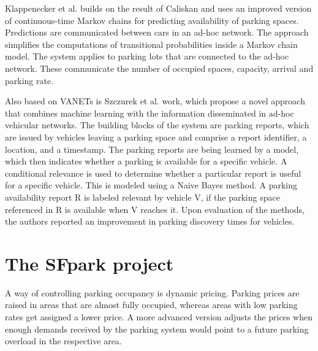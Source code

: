 \documentclass{article}
\newcommand{\cmmnt}[1]{\ignorespaces}
\begin{document}
	Klappenecker et al. \cmmnt{ref klappenecker} builds on the result of Caliskan and uses an improved version of continuous-time Markov chains for predicting availability of parking spaces. Predictions are communicated between cars in an ad-hoc network. The approach simplifies the computations of transitional probabilities inside a Markov chain model. The system applies to parking lots that are connected to the ad-hoc network. These communicate the number of occupied spaces, capacity, arrival and parking rate. 
	
	Also based on VANETs is Szczurek et al. \cmmnt{ref szczurek} work, which propose a novel approach that combines machine learning with the information disseminated in ad-hoc vehicular networks. The building blocks of the system are parking reports, which are issued by vehicles leaving a parking space and comprise a report identifier, a location, and a timestamp. The parking reports are being learned by a model, which then indicates whether a parking is available for a specific vehicle. A conditional relevance is used to determine whether a particular report is useful for a specific vehicle. This is modeled using a Naive Bayes method. A parking availability report R is labeled relevant by vehicle V, if the parking space referenced in R is available when V reaches it. Upon evaluation of the methods, the authors reported an improvement in parking discovery times for vehicles.
	
	\section{The SFpark project}
	A way of controlling parking occupancy is dynamic pricing. Parking prices are raised in areas that are almost fully occupied, whereas areas with low parking rates get assigned a lower price. A more advanced version adjusts the prices when enough demands received by the parking system would point to a future parking overload in the respective area.
	
\end{document}
